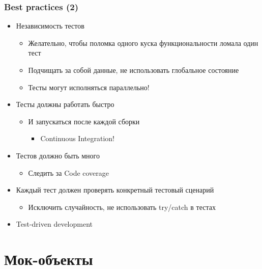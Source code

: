 \documentclass{../../slides-style}
\begin{document}
    \begin{frame}
        \frametitle{Best practices (2)}
        \begin{itemize}
            \item Независимость тестов
            \begin{itemize}
                \item Желательно, чтобы поломка одного куска функциональности ломала один тест
                \item Подчищать за собой данные, не использовать глобальное состояние
                \item Тесты могут исполняться параллельно!
            \end{itemize}
            \item Тесты должны работать быстро
            \begin{itemize}
                \item И запускаться после каждой сборки
                \begin{itemize}
                    \item Continuous Integration!
                \end{itemize}
            \end{itemize}
            \item Тестов должно быть много
            \begin{itemize}
                \item Следить за Code coverage
            \end{itemize}
            \item Каждый тест должен проверять конкретный тестовый сценарий
            \begin{itemize}
                \item Исключить случайность, не использовать try/catch в тестах
            \end{itemize}
            \item Test-driven development
        \end{itemize}
    \end{frame}

    \section{Мок-объекты}
\end{document}
